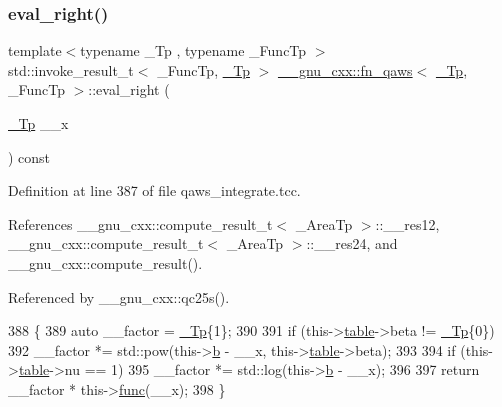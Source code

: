 \subsubsection{\texorpdfstring{eval\+\_\+right()}{eval\_right()}}
{\footnotesize\ttfamily template$<$typename \+\_\+\+Tp , typename \+\_\+\+Func\+Tp $>$ \\
std\+::invoke\+\_\+result\+\_\+t$<$ \+\_\+\+Func\+Tp, \hyperlink{namespace____gnu__cxx_a3b19a9c800ca194374ef9172290f7d79}{\+\_\+\+Tp} $>$ \hyperlink{struct____gnu__cxx_1_1fn__qaws}{\+\_\+\+\_\+gnu\+\_\+cxx\+::fn\+\_\+qaws}$<$ \hyperlink{namespace____gnu__cxx_a3b19a9c800ca194374ef9172290f7d79}{\+\_\+\+Tp}, \+\_\+\+Func\+Tp $>$\+::eval\+\_\+right (\begin{DoxyParamCaption}\item[{\hyperlink{namespace____gnu__cxx_a3b19a9c800ca194374ef9172290f7d79}{\+\_\+\+Tp}}]{\+\_\+\+\_\+x }\end{DoxyParamCaption}) const}



Definition at line 387 of file qaws\+\_\+integrate.\+tcc.



References \+\_\+\+\_\+gnu\+\_\+cxx\+::compute\+\_\+result\+\_\+t$<$ \+\_\+\+Area\+Tp $>$\+::\+\_\+\+\_\+res12, \+\_\+\+\_\+gnu\+\_\+cxx\+::compute\+\_\+result\+\_\+t$<$ \+\_\+\+Area\+Tp $>$\+::\+\_\+\+\_\+res24, and \+\_\+\+\_\+gnu\+\_\+cxx\+::compute\+\_\+result().



Referenced by \+\_\+\+\_\+gnu\+\_\+cxx\+::qc25s().


\begin{DoxyCode}
388     \{
389       \textcolor{keyword}{auto} \_\_factor = \hyperlink{namespace____gnu__cxx_a3b19a9c800ca194374ef9172290f7d79}{\_Tp}\{1\};
390 
391       \textcolor{keywordflow}{if} (this->\hyperlink{struct____gnu__cxx_1_1fn__qaws_a8a96359bac745cd83938fc0735a9168d}{table}->beta != \hyperlink{namespace____gnu__cxx_a3b19a9c800ca194374ef9172290f7d79}{\_Tp}\{0\})
392         \_\_factor *= std::pow(this->\hyperlink{struct____gnu__cxx_1_1fn__qaws_a35f509512c31f2ee8fddc16405dc6e80}{b} - \_\_x, this->\hyperlink{struct____gnu__cxx_1_1fn__qaws_a8a96359bac745cd83938fc0735a9168d}{table}->beta);
393 
394       \textcolor{keywordflow}{if} (this->\hyperlink{struct____gnu__cxx_1_1fn__qaws_a8a96359bac745cd83938fc0735a9168d}{table}->nu == 1)
395         \_\_factor *= std::log(this->\hyperlink{struct____gnu__cxx_1_1fn__qaws_a35f509512c31f2ee8fddc16405dc6e80}{b} - \_\_x);
396 
397       \textcolor{keywordflow}{return} \_\_factor * this->\hyperlink{struct____gnu__cxx_1_1fn__qaws_a0fe42f7ea452aae136c5dba3264c3e93}{func}(\_\_x);
398     \}
\end{DoxyCode}


